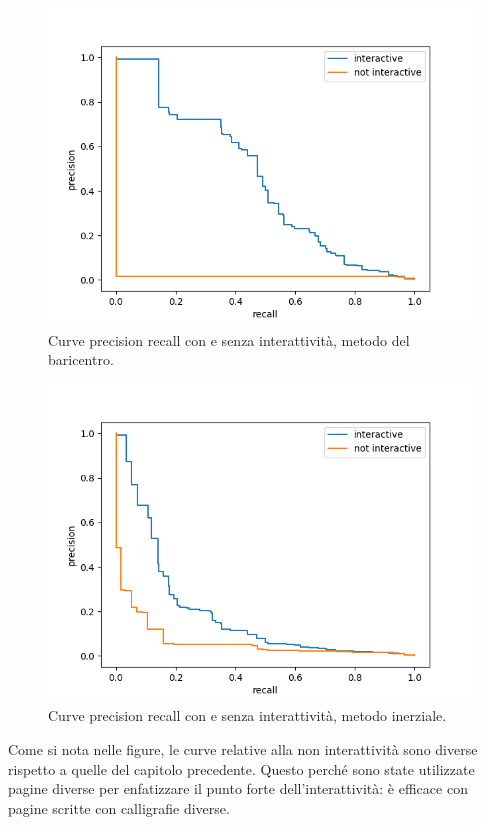 \begin{figure}
    \centering
    \includegraphics[width=.9\textwidth]{figures/graphs/totalbaricenterFalse.png}
    \caption{Curve precision recall con e senza interattivit\`a, metodo del baricentro.}
    \label{fig:graph_total_baricenter}
\end{figure}

\begin{figure}
    \centering
    \includegraphics[width=.9\textwidth]{figures/graphs/totalinertiaFalse.png}
    \caption{Curve precision recall con e senza interattivit\`a, metodo inerziale.}
    \label{fig:graph_total_inertia}
\end{figure}

Come si nota nelle figure, le curve relative alla non interattivit\`a sono diverse rispetto a quelle del capitolo precedente. Questo perch\'e sono state utilizzate pagine diverse per enfatizzare il punto forte dell'interattivit\`a: \`e efficace con pagine scritte con calligrafie diverse.

